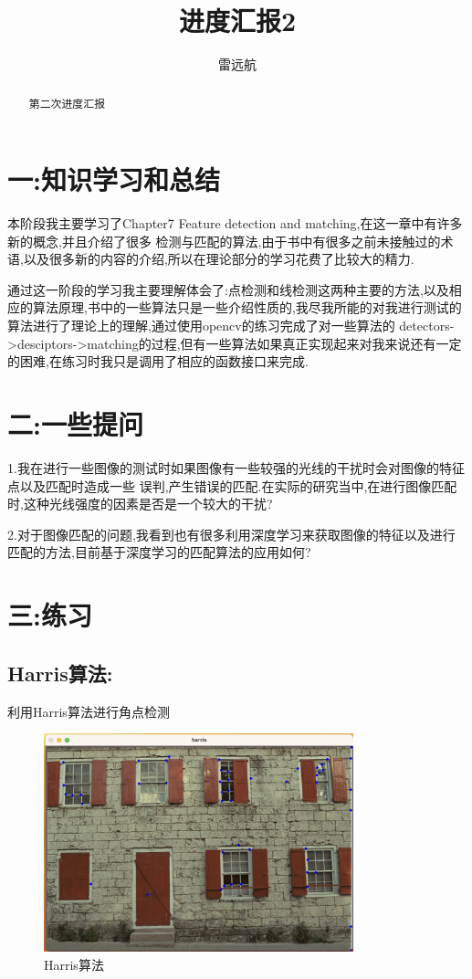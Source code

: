 \documentclass{article}
\title{进度汇报2}
\author{雷远航}
\begin{document}
\maketitle

\begin{abstract}
第二次进度汇报

\end{abstract}

\section*{一:知识学习和总结}
本阶段我主要学习了Chapter7 Feature detection and matching,在这一章中有许多新的概念,并且介绍了很多
检测与匹配的算法,由于书中有很多之前未接触过的术语,以及很多新的内容的介绍,所以在理论部分的学习花费了比较大的精力.

通过这一阶段的学习我主要理解体会了:点检测和线检测这两种主要的方法,以及相应的算法原理,书中的一些算法只是一些介绍性质的,我尽我所能的对我进行测试的算法进行了理论上的理解,通过使用opencv的练习完成了对一些算法的
detectors->desciptors->matching的过程,但有一些算法如果真正实现起来对我来说还有一定的困难,在练习时我只是调用了相应的函数接口来完成.

\section*{二:一些提问}

1.我在进行一些图像的测试时如果图像有一些较强的光线的干扰时会对图像的特征点以及匹配时造成一些
误判,产生错误的匹配.在实际的研究当中,在进行图像匹配时,这种光线强度的因素是否是一个较大的干扰?

2.对于图像匹配的问题,我看到也有很多利用深度学习来获取图像的特征以及进行匹配的方法,目前基于深度学习的匹配算法的应用如何?



\section*{三:练习}

\subsection*{Harris算法:}
利用Harris算法进行角点检测
    \begin{figure}[H]
    \centering
    \includegraphics[width=0.8\textwidth]{1.png}
    \caption{\label{pr2}Harris算法}
    \end{figure}
\end{document}
